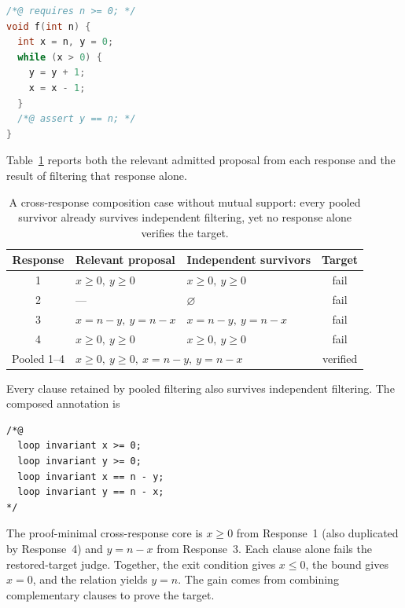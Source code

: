 \begin{lstlisting}[language=C]
/*@ requires n >= 0; */
void f(int n) {
  int x = n, y = 0;
  while (x > 0) {
    y = y + 1;
    x = x - 1;
  }
  /*@ assert y == n; */
}
\end{lstlisting}

Table~\ref{tab:no-support-composition-case} reports both the relevant admitted
proposal from each response and the result of filtering that response alone.

\begin{table}[H]
\centering
\small
\begin{tabular}{cllc}
\toprule
\rowcolor{algobg}
Response & Relevant proposal & Independent survivors & Target \\
\midrule
1 & \(x\geq0,\ y\geq0\) & \(x\geq0,\ y\geq0\) & fail \\
2 & --- & \(\varnothing\) & fail \\
3 & \(x=n-y,\ y=n-x\) & \(x=n-y,\ y=n-x\) & fail \\
4 & \(x\geq0,\ y\geq0\) & \(x\geq0,\ y\geq0\) & fail \\
\midrule
Pooled 1--4 & \multicolumn{2}{l}{\(x\geq0,\ y\geq0,\ x=n-y,\ y=n-x\)} & verified \\
\bottomrule
\end{tabular}
\caption{A cross-response composition case without mutual support: every
pooled survivor already survives independent filtering, yet no response alone
verifies the target.}
\label{tab:no-support-composition-case}
\end{table}

\noindent\begin{minipage}{\textwidth}
Every clause retained by pooled filtering also survives independent filtering.
The composed annotation is
\begin{lstlisting}
/*@
  loop invariant x >= 0;
  loop invariant y >= 0;
  loop invariant x == n - y;
  loop invariant y == n - x;
*/
\end{lstlisting}
The proof-minimal cross-response core is \(x\geq0\) from Response~1 (also
duplicated by Response~4) and \(y=n-x\) from Response~3.  Each clause alone
fails the restored-target judge.  Together, the exit condition gives
\(x\leq0\), the bound gives \(x=0\), and the relation yields \(y=n\).
The gain comes from combining complementary clauses to prove the target.
\end{minipage}

